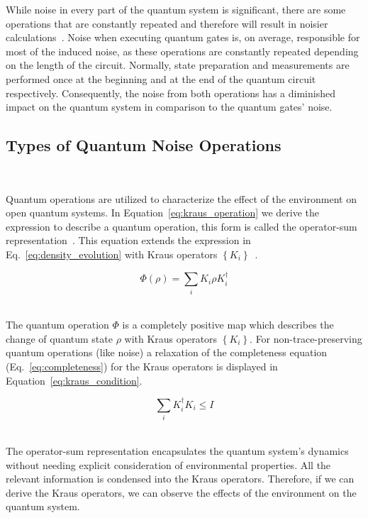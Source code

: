 While noise in every part of the quantum system is significant, there
are some operations that are constantly repeated and therefore will result
in noisier calculations~\cite{resch_benchmarking_2022}. Noise when executing quantum gates
is, on average, responsible for most of the induced noise, as these
operations are constantly repeated depending on the length of the circuit. 
Normally, state preparation and measurements are performed once at the
beginning and at the end of the quantum circuit respectively. Consequently,
the noise from both operations has a diminished impact on the quantum
system in comparison to the quantum gates' noise. \ 

\subsection{Types of Quantum Noise Operations}\label{subsection:operation_types} \

Quantum operations are utilized to characterize the effect of the
environment on open quantum systems. In Equation~\ref{eq:kraus_operation}
we derive the expression to describe a quantum operation, this form is
called the operator-sum representation~\cite{breuer_theory_2007}. This equation extends
the expression in Eq.~\ref{eq:density_evolution} with Kraus operators
\(\left\{K_i\right\}\)~\cite{kraus_general_1971}. \

\begin{equation}\label{eq:kraus_operation}
  \Phi \left(\rho\right) = \sum_{i} K_{i} \rho K_{i}^{\dag}
\end{equation} \

The quantum operation \(\Phi\) is a completely positive map which
describes the change of quantum state \(\rho\) with Kraus operators
\(\left\{K_i\right\}\). For non-trace-preserving quantum operations
(like noise) a relaxation of the completeness equation
(Eq.~\ref{eq:completeness}) for the Kraus operators is displayed
in Equation~\ref{eq:kraus_condition}. \

\begin{equation}\label{eq:kraus_condition}
  \sum_{i} K_{i}^{\dag} K_{i} \leq I
\end{equation} \

The operator-sum representation encapsulates the quantum system's
dynamics without needing explicit consideration of environmental
properties. All the relevant information is condensed into the 
Kraus operators. Therefore, if we can derive the Kraus operators, we
can observe the effects of the environment on the quantum system. \

